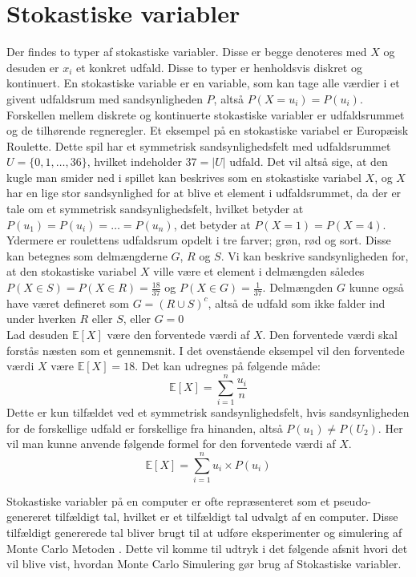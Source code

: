\documentclass[../../SRP.tex]{subfiles}
\begin{document}
\section{Stokastiske variabler}

Der findes to typer af stokastiske variabler. Disse er begge denoteres med $X$ og desuden er $x_i$ et konkret udfald. Disse to typer er henholdsvis diskret og kontinuert. En stokastiske variable er en variable, som kan tage alle værdier i et givent udfaldsrum med sandsynligheden $P$, altså $P(X = u_i) = P(u_i)$. Forskellen mellem diskrete og kontinuerte stokastiske variabler er udfaldsrummet og de tilhørende regneregler. Et eksempel på en stokastiske variabel er Europæisk Roulette. Dette spil har et symmetrisk sandsynlighedsfelt med udfaldsrummet $U = \{ 0,1,\dots,36\}$, hvilket indeholder $37 = |U|$ udfald. Det vil altså sige, at den kugle man smider ned i spillet kan beskrives som en stokastiske variabel $X$, og $X$ har en lige stor sandsynlighed for at blive et element i udfaldsrummet, da der er tale om et symmetrisk sandsynlighedsfelt, hvilket betyder at $P(u_1) = P(u_i) = \dots = P(u_n)$, det betyder at $P(X = 1) = P(X = 4)$. Ydermere er roulettens udfaldsrum opdelt i tre farver; grøn, rød og sort. Disse kan betegnes som delmængderne $G$, $R$ og $S$. Vi kan beskrive sandsynligheden for, at den stokastiske variabel $X$ ville være et element i delmængden således $P(X \in S) = P(X \in R) = \frac{18}{37}$ og $P(X \in G) = \frac{1}{37}$. Delmængden $G$ kunne også have været defineret som $G = (R \cup S)^c$, altså de udfald som ikke falder ind under hverken $R$ eller $S$, eller $G = 0$ \cite{NM} \\

Lad desuden $\mathbb{E}[X]$ være den forventede værdi af $X$. Den forventede værdi skal forstås næsten som et gennemsnit. I det ovenstående eksempel vil den forventede værdi $X$ være $\mathbb{E}[X] = 18$. Det kan udregnes på følgende måde:
\begin{equation}
  \mathbb{E}[X] = \sum_{i = 1}^n \frac{u_i}{n}
\end{equation}
Dette er kun tilfældet ved et symmetrisk sandsynlighedsfelt, hvis sandsynligheden for de forskellige udfald er forskellige fra hinanden, altså  $P(u_1) \neq P(U_2)$. Her vil man kunne anvende følgende formel for den forventede værdi af $X$.
\begin{equation}
  \mathbb{E}[X] = \sum_{i = 1}^n u_i \times P(u_i)
\end{equation}

Stokastiske variabler på en computer er ofte repræsenteret som et pseudo-genereret tilfældigt tal, hvilket er et tilfældigt tal udvalgt af en computer. Disse tilfældigt genererede tal bliver brugt til at udføre eksperimenter og simulering af Monte Carlo Metoden \cite{SBM}. Dette vil komme til udtryk i det følgende afsnit hvori det vil blive vist, hvordan Monte Carlo Simulering gør brug af Stokastiske variabler. 
\end{document}
